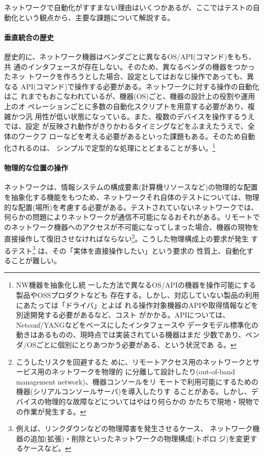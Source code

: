 ネットワークで自動化がすすまない理由はいくつかあるが、ここではテストの自
動化という観点から、主要な課題について解説する。

    \paragraph{垂直統合の歴史}
歴史的に、ネットワーク機器はベンダごとに異なるOS/API(コマンド)をもち、共
通のインタフェースが存在しない。そのため、異なるベンダの機器をつかったネッ
トワークを作ろうとした場合、設定としてはおなじ操作であっても、異なる
API(コマンド)で操作する必要がある。ネットワークに対する操作の自動化はこ
れまでもおこなわれているが、機器(OS)ごと、機器の設計上の役割や運用上のオ
ペレーションごとに多数の自動化スクリプトを用意する必要があり、複雑かつ汎
用性が低い状態になっている。また、複数のデバイスを操作するうえでは、設定
が反映され動作がきりかわるタイミングなどをふまえたうえで、全体のワークフ
ローなどを考える必要があるといった課題もある。そのため自動化されるのは、
シンプルで定型的な処理にとどまることが多い。\footnote{NW機器を抽象化し統
一した方法で異なるOS/APIの機器を操作可能にする製品やOSSプロダクトなども
存在する。しかし、対応していない製品の利用にあたっては「ドライバ」とよば
れる操作対象機器のAPIや取得情報などを別途開発する必要があるなど、コスト
がかかる。APIについては、Netconf/YANGなどをベースにしたインタフェースや
データモデル標準化の動きはあるものの、現時点では実装されている機器はまだ
少数であり、ベンダ/OSごとに個別にとりあつかう必要がある、という状況であ
る。}

    \paragraph{物理的な位置の操作}
ネットワークは、情報システムの構成要素(計算機リソースなど)の物理的な配置
を抽象化する機能をもつため、ネットワークそれ自体のテストについては、物理
的な配置(場所)を考慮する必要がある。テストされていないネットワークでは、
何らかの問題によりネットワークが通信不可能になるおそれがある。リモートで
のネットワーク機器へのアクセスが不可能になってしまった場合、機器の現物を
直接操作して復旧させなければならない\footnote{こうしたリスクを回避するた
めに、リモートアクセス用のネットワークとサービス用のネットワークを物理的
に分離して設計したり(out-of-band management network)、機器コンソールをリ
モートで利用可能にするための機器(シリアルコンソールサーバ)を導入したりす
ることがある。しかし、デバイスの物理的な故障などについてはやはり何らかの
かたちで現地・現物での作業が発生する。}。こうした物理構成上の要求が発生
するテスト\footnote{例えば、リンクダウンなどの物理障害を発生させるケース、
ネットワーク機器の追加(拡張)・削除といったネットワークの物理構成(トポロ
ジ)を変更するケースなど。} は、その「実体を直接操作したい」という要求の
性質上、自動化することが難しい。

